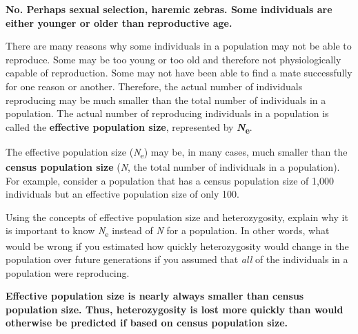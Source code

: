 \documentclass[11pt, addpoints, hidelinks]{exam}
\begin{document}
\begin{questions}
\begin{minipage}[t][3cm]{\textwidth}
	\ifprintanswers
	\textbf{No.  Perhaps sexual selection, haremic zebras.  Some individuals are either younger or older than reproductive age.}
	\fi
\end{minipage}

\newpage

There are many reasons why some individuals in a population may not be able to reproduce. Some may be too young or too old and therefore not physiologically capable of reproduction. Some may not have been able to find a mate successfully for one reason or another. Therefore, the actual number of individuals reproducing may be much smaller than the total number of individuals in a population. The actual number of reproducing individuals in a population is called the \textbf{effective population size}, represented by \textbf{\emph{N}\textsubscript{e}}.

The effective population size (\emph{N}\textsubscript{e}) may be, in many cases, much smaller than the \textbf{census population size} (\emph{N}, the total number of individuals in a population). For example, consider a population that has a census population size of 1,000 individuals but an effective population size of only 100.



\question[2] Using the concepts of effective population size and
heterozygosity, explain why it is important to know
\emph{N}\textsubscript{e} instead of \emph{N} for a population. In other
words, what would be wrong if you estimated how quickly heterozygosity
would change in the population over future generations if you assumed
that \emph{all} of the individuals in a population were reproducing.

\begin{minipage}[t][6cm]{\textwidth}
	\ifprintanswers
	\textbf{Effective population size is nearly always smaller than census population size.  Thus, heterozygosity is lost more quickly than would otherwise be predicted if based on census population size.}
	\fi
\end{minipage}

\end{questions}
\end{document}
